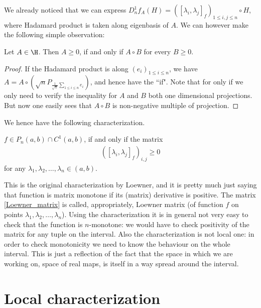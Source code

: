 We already noticed that we can express $D^{1}_{n}f_{A}(H) = ([\lambda_{i}, \lambda_{j}]_{f})_{1 \leq i, j \leq n}\circ H$, where Hadamard product is taken along eigenbasis of $A$. We can however make the following simple observation:

\begin{lem}
	Let $A \in \H$. Then $A \geq 0$, if and only if $A \circ B$ for every $B \geq 0$.
\end{lem}

\begin{proof}
	If the Hadamard product is along $(e_{i})_{1 \leq i \leq n}$, we have $A = A \circ \left(\sqrt{n} P_{\frac{1}{\sqrt{n}}\sum_{1 \leq i \leq n} e_{i}} \right)$, and hence have the ``if". Note that for only if we only need to verify the inequality for $A$ and $B$ both one dimensional projections. But now one easily sees that $A \circ B$ is non-negative multiple of projection.
\end{proof}

We hence have the following characterization.

\begin{lause}
	$f \in P_{n}(a, b) \cap C^{1}(a, b)$, if and only if the matrix
	\begin{align}\label{Loewner_matrix}
		\left([\lambda_{i}, \lambda_{j}]_{f}\right)_{i, j} \geq 0
	\end{align}
	for any $\lambda_{1}, \lambda_{2}, \ldots, \lambda_{n} \in (a, b)$.
\end{lause}

This is the original characterization by Loewner, and it is pretty much just saying that function is matrix monotone if its (matrix) derivative is positive. The matrix \ref{Loewner_matrix} is called, appropriately, Loewner matrix (of function $f$ on points $\lambda_{1}, \lambda_{2}, \ldots, \lambda_{n}$). Using the characterization it is in general not very easy to check that the function is $n$-monotone: we would have to check positivity of the matrix for any tuple on the interval. Also the characterization is not local one: in order to check monotonicity we need to know the behaviour on the whole interval. This is just a reflection of the fact that the space in which we are working on, space of real maps, is itself in a way spread around the interval.

\section{Local characterization}

